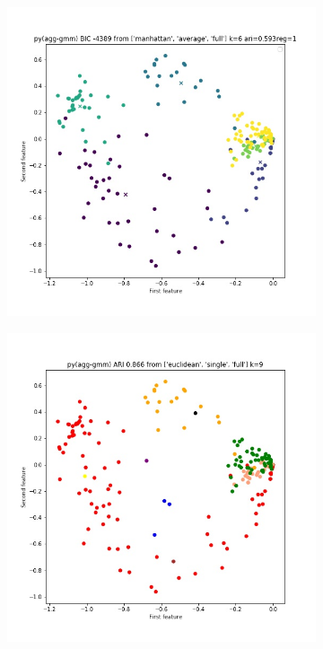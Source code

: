 \documentclass{article}
\begin{document}
\begin{figure}[h!]
\centering
\begin{subfigure}[b]{0.4\linewidth}
  \includegraphics[width=\linewidth]{python_bic_allk.jpg}
\end{subfigure}
\begin{subfigure}[b]{0.4\linewidth}
  \includegraphics[width=\linewidth]{python_ari_allk.jpg}


\end{subfigure}
\end{figure}
\end{document}
